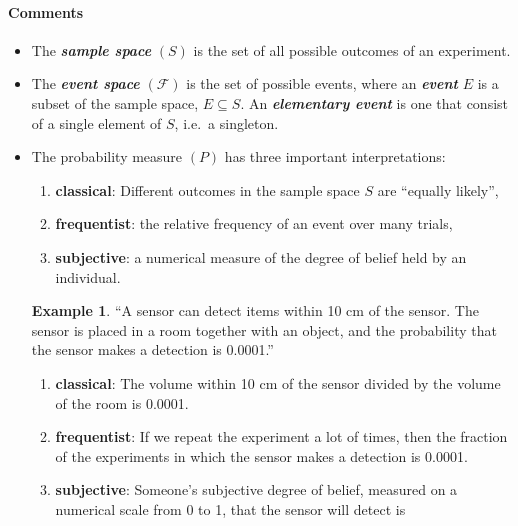 \documentclass[12pt]{report}
\theoremstyle{definition}
\begin{document}
\paragraph{Comments}
\begin{itemize}
    \item The \textbf{\emph{sample space}} $(S)$ is the set of all possible
        outcomes of an experiment.
    \item The \textbf{\emph{event space}} $(\mathcal{F})$ is the set of possible
        events, where an \textbf{\emph{event}} $E$ is a subset of the sample
        space, $E\subseteq S$. An \textbf{\emph{elementary event}} is one that
        consist of a single element of $S$, i.e.\ a singleton.
    \item The probability measure $(P)$ has three important interpretations:
        \begin{enumerate}
            \item \textbf{classical}:
                Different outcomes in the sample space $S$ 
                are ``equally likely'',
            \item \textbf{frequentist}:
                the relative frequency of an event over many trials,
            \item \textbf{subjective}:
                a numerical measure of the degree of belief held by an individual.
        \end{enumerate} 
        \newtheorem{probability-interpretations}[theorem]{Example}
        \begin{probability-interpretations}
            ``A sensor can detect items within 10 cm of the sensor.
            The sensor is placed in a room together with an object, and
            the probability that the sensor makes a detection is 0.0001.''
            \begin{enumerate}
                \item \textbf{classical}:
                    The volume within 10 cm of the sensor divided by the volume
                    of the room is 0.0001.
                \item \textbf{frequentist}:
                    If we repeat the experiment a lot of times, then the
                    fraction of the experiments in which the sensor makes a
                    detection is 0.0001.
                \item \textbf{subjective}:
                    Someone's subjective degree of belief, measured on a
                    numerical scale from 0 to 1, that the sensor will detect is

\end{enumerate}
\end{probability-interpretations}
\end{itemize}
\end{document}
